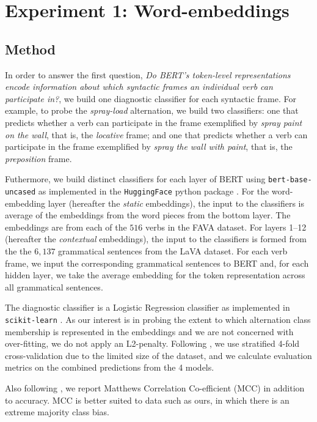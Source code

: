 \documentclass[11pt]{article}
\begin{document}
\section{Experiment 1: Word-embeddings}
\label{sec:experiment1}

\subsection{Method}
In order to answer the first question, \textit{Do BERT's token-level representations encode information about which syntactic frames an individual verb can participate in?}, we build one diagnostic classifier for each syntactic frame.  For example, to probe the \textit{spray-load} alternation, we build two classifiers: one that predicts whether a verb can participate in the  frame exemplified by \textit{spray paint on the wall}, that is, the \textit{locative} frame; and one that predicts whether a verb can participate in the frame exemplified by \textit{spray the wall with paint}, that is, the \textit{preposition} frame.  

Futhermore, we build distinct classifiers for each layer of BERT using \texttt{bert-base-uncased} as implemented in the \texttt{HuggingFace} python package \citep{huggingface}.  For the word-embedding layer (hereafter the \textit{static} embeddings), the input to the classifiers is average of the embeddings from the word pieces from the bottom layer.  The embeddings are from each of the $516$ verbs in the FAVA dataset.  For layers 1--12 (hereafter the \textit{contextual} embeddings), the input to the classifiers is formed from the the $6,137$ grammatical sentences from the LaVA dataset.  For each verb frame, we input the corresponding grammatical sentences to BERT and, for each hidden layer, we take the average embedding for the token representation across all grammatical sentences.

The diagnostic classifier is a Logistic Regression classifier as implemented in \texttt{scikit-learn} \citep{sklearn}.  As our interest is in probing the extent to which alternation class membership is represented in the embeddings and we are not concerned with over-fitting, we do not apply an L2-penalty. Following \citet{kann-etal-2019-verb}, we use stratified 4-fold cross-validation due to the limited size of the dataset, and we calculate evaluation metrics on the combined predictions from the 4 models.

Also following \citet{kann-etal-2019-verb}, we report Matthews Correlation Co-efficient (MCC) \citep{mcc} in addition to accuracy.  MCC is better suited to data such as ours, in which there is an extreme majority class bias.
\end{document}
